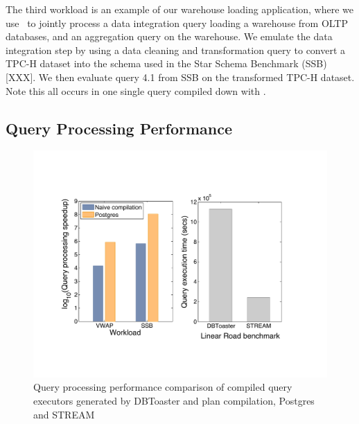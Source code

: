 The third workload is an example of our warehouse loading application, where we
use \compiler\ to jointly process a data integration query loading a warehouse
from OLTP databases, and an aggregation query on the warehouse. We emulate the
data integration step by using a data cleaning and transformation query to
convert a TPC-H dataset into the schema used in the Star Schema Benchmark
(SSB) [XXX]. We then evaluate query 4.1 from SSB on the transformed TPC-H
dataset. Note this all occurs in one single query compiled down with \compiler.




\subsection{Query Processing Performance}

\begin{figure}
\begin{center}
\includegraphics[scale=0.25]{../plots/toaster_comparison}
\end{center}
\caption{Query processing performance comparison of compiled query executors
generated by DBToaster and plan compilation, Postgres and STREAM}
\label{fig:dbtperf}
\end{figure}

